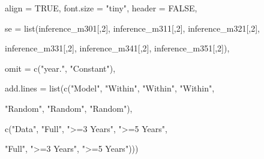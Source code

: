 \documentclass[a4paper,nobind]{templates/ociamthesis}
\newenvironment{Shaded}{\begin{snugshade}}{\end{snugshade}}
\newcommand{\AttributeTok}[1]{\textcolor[rgb]{0.77,0.63,0.00}{#1}}
\newcommand{\ConstantTok}[1]{\textcolor[rgb]{0.00,0.00,0.00}{#1}}
\newcommand{\DecValTok}[1]{\textcolor[rgb]{0.00,0.00,0.81}{#1}}
\newcommand{\FunctionTok}[1]{\textcolor[rgb]{0.00,0.00,0.00}{#1}}
\newcommand{\NormalTok}[1]{#1}
\newcommand{\StringTok}[1]{\textcolor[rgb]{0.31,0.60,0.02}{#1}}
\renewenvironment{Shaded}
{
  \vspace{10pt}%
  \begin{snugshade}%
}{%
  \end{snugshade}%
  \vspace{8pt}%
}
\begin{document}
\begin{landscape}
\begin{Shaded}
\begin{Highlighting}[]
          \AttributeTok{align =} \ConstantTok{TRUE}\NormalTok{, }\AttributeTok{font.size =} \StringTok{"tiny"}\NormalTok{, }\AttributeTok{header =} \ConstantTok{FALSE}\NormalTok{, }
         
         \AttributeTok{se =} \FunctionTok{list}\NormalTok{(inference\_m301[,}\DecValTok{2}\NormalTok{], inference\_m311[,}\DecValTok{2}\NormalTok{], inference\_m321[,}\DecValTok{2}\NormalTok{], }
          
\NormalTok{          inference\_m331[,}\DecValTok{2}\NormalTok{], inference\_m341[,}\DecValTok{2}\NormalTok{], inference\_m351[,}\DecValTok{2}\NormalTok{]),}
         
          \AttributeTok{omit =} \FunctionTok{c}\NormalTok{(}\StringTok{"year."}\NormalTok{, }\StringTok{"Constant"}\NormalTok{),}
          
          \AttributeTok{add.lines =} \FunctionTok{list}\NormalTok{(}\FunctionTok{c}\NormalTok{(}\StringTok{"Model"}\NormalTok{, }\StringTok{"Within"}\NormalTok{, }\StringTok{"Within"}\NormalTok{, }\StringTok{"Within"}\NormalTok{, }
                        
            \StringTok{"Random"}\NormalTok{, }\StringTok{"Random"}\NormalTok{, }\StringTok{"Random"}\NormalTok{), }
            
            \FunctionTok{c}\NormalTok{(}\StringTok{"Data"}\NormalTok{, }\StringTok{"Full"}\NormalTok{, }\StringTok{"\textgreater{}=3 Years"}\NormalTok{, }\StringTok{"\textgreater{}=5 Years"}\NormalTok{, }
                                             
            \StringTok{"Full"}\NormalTok{, }\StringTok{"\textgreater{}=3 Years"}\NormalTok{, }\StringTok{"\textgreater{}=5 Years"}\NormalTok{)))}
\end{Highlighting}
\end{Shaded}


\end{landscape}
\end{document}
